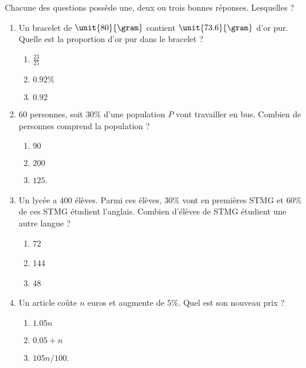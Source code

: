 
\begin{exercice}\label{exoPremiere-0014}

    Chacune des questions possède une, deux ou trois bonnes réponses. Lesquelles ?
    \begin{multicols}{2}
    \begin{enumerate}
    \item
        Un bracelet de \( \unit{80}{\gram}\) contient \( \unit{73.6}{\gram}\) d'or pur. Quelle est la proportion d'or pur dans le bracelet ?
        \begin{enumerate}
            \item
        \( \frac{ 23 }{ 25 }\)
    \item
        \( 0.92\%\)
    \item
        \( 0.92\)

        \end{enumerate}

    \item
        \( 60\) personnes, soit \( 30\%\) d'une population \( P\) vont travailler en bus. Combien de personnes comprend la population ?
        \begin{enumerate}
            \item
                $90$
            \item
                \( 200\)
            \item
                \( 125\).
        \end{enumerate}
    \item
        Un lycée a \( 400\) élèves. Parmi ces élèves, \( 30\%\) vont en premières STMG et \( 60\%\) de ces STMG étudient l'anglais. Combien d'élèves de STMG étudient une autre langue ?
        \begin{enumerate}
            \item
                72
            \item
                144
            \item
                48
        \end{enumerate}
    \item
        Un article coûte \( n\) euros et augmente de \( 5\%\). Quel est son nouveau prix ?
        \begin{enumerate}
            \item
                \( 1.05n\)
            \item
                \( 0.05+n\)
            \item
                \( 105n/100\).
        \end{enumerate}


\end{enumerate}
\end{multicols}
\end{exercice}
